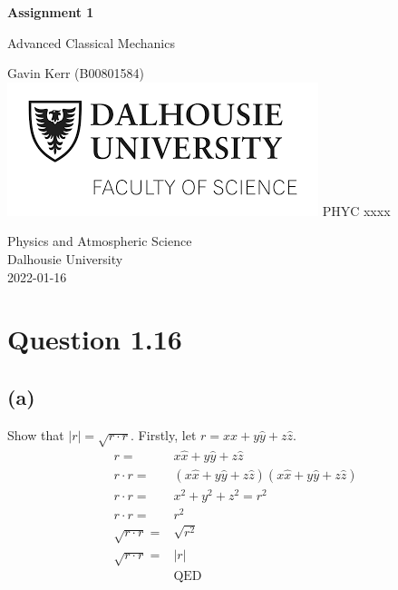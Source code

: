 \documentclass[12pt, a4paper]{article}
\begin{document}
\begin{titlepage}
   \begin{center}
       \vspace*{0.5cm}

       \LARGE{\textbf{Assignment 1}}

       \vspace{1cm}
        \Large{Advanced Classical Mechanics}
            
       \vspace{1cm}
		\small{Gavin Kerr (B00801584)} \\
		\vfill
		\includegraphics[scale=0.65]{dal_logo2.png}
       \vfill
           \large{PHYC xxxx}
            
       \vspace{0.8cm}
     
            
       Physics and Atmospheric Science\\
       Dalhousie University\\
       2022-01-16
            
   \end{center}
\end{titlepage}



\section*{Question 1.16}
\subsection*{(a)}
Show that $|r| = \sqrt{r\cdot r}$. Firstly, let $r = x\hat{x} + y \hat{y} + z \hat{z}$.
\begin{align*}
r =& x\hat{x} + y \hat{y} + z \hat{z}
\\
r\cdot r =& (x\hat{x} + y \hat{y} + z \hat{z})(x\hat{x} + y \hat{y} + z \hat{z})
\\
r\cdot r =& x^2 + y^2 + z^2 = r^2
\\
r\cdot r =& r^2
\\
\sqrt{r\cdot r} =& \sqrt{r^2}
\\
\sqrt{r\cdot r} =& |r|
\\
&\text{QED}
\end{align*}
\end{document}

